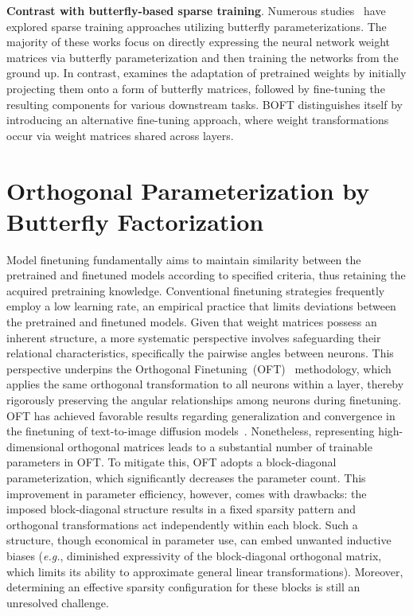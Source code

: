 \textbf{Contrast with butterfly-based sparse training}. Numerous studies~\cite{dao2019learning,dao2019kaleidoscope,chen2022pixelated,dao2022monarch} have explored sparse training approaches utilizing butterfly parameterizations. The majority of these works focus on directly expressing the neural network weight matrices via butterfly parameterization and then training the networks from the ground up. In contrast, \cite{dao2022monarch} examines the adaptation of pretrained weights by initially projecting them onto a form of butterfly matrices, followed by fine-tuning the resulting components for various downstream tasks. BOFT distinguishes itself by introducing an alternative fine-tuning approach, where weight transformations occur via weight matrices shared across layers.

\section{Orthogonal Parameterization by Butterfly Factorization}

Model finetuning fundamentally aims to maintain similarity between the pretrained and finetuned models according to specified criteria, thus retaining the acquired pretraining knowledge. Conventional finetuning strategies frequently employ a low learning rate, an empirical practice that limits deviations between the pretrained and finetuned models. Given that weight matrices possess an inherent structure, a more systematic perspective involves safeguarding their relational characteristics, specifically the pairwise angles between neurons. This perspective underpins the Orthogonal Finetuning~(OFT)~\cite{qiu2023controlling} methodology, which applies the same orthogonal transformation to all neurons within a layer, thereby rigorously preserving the angular relationships among neurons during finetuning. OFT has achieved favorable results regarding generalization and convergence in the finetuning of text-to-image diffusion models~\cite{qiu2023controlling}. Nonetheless, representing high-dimensional orthogonal matrices leads to a substantial number of trainable parameters in OFT. To mitigate this, OFT adopts a block-diagonal parameterization, which significantly decreases the parameter count. This improvement in parameter efficiency, however, comes with drawbacks: the imposed block-diagonal structure results in a fixed sparsity pattern and orthogonal transformations act independently within each block. Such a structure, though economical in parameter use, can embed unwanted inductive biases (\emph{e.g.}, diminished expressivity of the block-diagonal orthogonal matrix, which limits its ability to approximate general linear transformations). Moreover, determining an effective sparsity configuration for these blocks is still an unresolved challenge.

